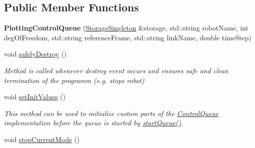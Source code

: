 \subsection*{Public Member Functions}
\begin{DoxyCompactItemize}
\item 
{\bfseries Plotting\+Control\+Queue} (\hyperlink{classkukadu_1_1StorageSingleton}{Storage\+Singleton} \&storage, std\+::string robot\+Name, int deg\+Of\+Freedom, std\+::string reference\+Frame, std\+::string link\+Name, double time\+Step)\hypertarget{classkukadu_1_1PlottingControlQueue_acd81aa9c1c38a07d7eebf75843eb3e47}{}\label{classkukadu_1_1PlottingControlQueue_acd81aa9c1c38a07d7eebf75843eb3e47}

\item 
void \hyperlink{classkukadu_1_1PlottingControlQueue_ae15b42e3d6b4b98bc2e470ff3ab3f7ea}{safely\+Destroy} ()
\begin{DoxyCompactList}\small\item\em Method is called whenever destroy event occurs and ensures safe and clean termination of the programm (e.\+g. stops robot) \end{DoxyCompactList}\item 
void \hyperlink{classkukadu_1_1PlottingControlQueue_a6404b4ad14c35eaaf8d5afdf5ca271bb}{set\+Init\+Values} ()\hypertarget{classkukadu_1_1PlottingControlQueue_a6404b4ad14c35eaaf8d5afdf5ca271bb}{}\label{classkukadu_1_1PlottingControlQueue_a6404b4ad14c35eaaf8d5afdf5ca271bb}

\begin{DoxyCompactList}\small\item\em This method can be used to initialize custom parts of the \hyperlink{classkukadu_1_1ControlQueue}{Control\+Queue} implementation before the queue is started by \hyperlink{classkukadu_1_1ControlQueue_a35d6a6e4e7c8467691c11567fe21f340}{start\+Queue()}. \end{DoxyCompactList}\item 
void \hyperlink{classkukadu_1_1PlottingControlQueue_aa15ad1445f3b35e0d86a0e3f8b945ecb}{stop\+Current\+Mode} ()\hypertarget{classkukadu_1_1PlottingControlQueue_aa15ad1445f3b35e0d86a0e3f8b945ecb}{}\label{classkukadu_1_1PlottingControlQueue_aa15ad1445f3b35e0d86a0e3f8b945ecb}


\end{DoxyCompactItemize}
